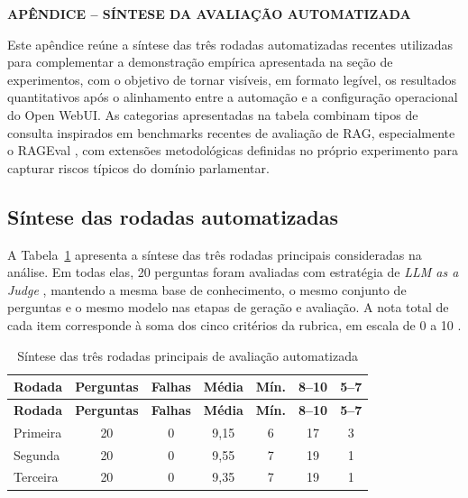 \appendix
\clearpage
{}
{}
\begin{center}
\textbf{APÊNDICE  -- SÍNTESE DA AVALIAÇÃO AUTOMATIZADA}
\end{center}
\label{sec:apendice-avaliacao}

Este apêndice reúne a síntese das três rodadas automatizadas recentes utilizadas para complementar a demonstração empírica apresentada na seção de experimentos, com o objetivo de tornar visíveis, em formato legível, os resultados quantitativos após o alinhamento entre a automação e a configuração operacional do Open WebUI. As categorias apresentadas na tabela combinam tipos de consulta inspirados em benchmarks recentes de avaliação de RAG, especialmente o RAGEval \parencite{zhuEtAl2025rageval}, com extensões metodológicas definidas no próprio experimento para capturar riscos típicos do domínio parlamentar.

\subsection{Síntese das rodadas automatizadas}

A Tabela~\ref{tab:rodadas-avaliacao} apresenta a síntese das três rodadas principais consideradas na análise. Em todas elas, 20 perguntas foram avaliadas com estratégia de \textit{LLM as a Judge} \parencite{liuEtAl2025judgeRag}, mantendo a mesma base de conhecimento, o mesmo conjunto de perguntas e o mesmo modelo nas etapas de geração e avaliação. A nota total de cada item corresponde à soma dos cinco critérios da rubrica, em escala de 0 a 10 \parencite{liuEtAl2023geval}.

\begingroup
\footnotesize
\begin{longtable}{@{}>{\raggedright\arraybackslash}p{}cccccc@{}}
\caption{Síntese das três rodadas principais de avaliação automatizada}
\label{tab:rodadas-avaliacao}\\
\textbf{Rodada} & \textbf{Perguntas} & \textbf{Falhas} & \textbf{Média} & \textbf{Mín.} & \textbf{8--10} & \textbf{5--7} \\
\hline
\endfirsthead
\textbf{Rodada} & \textbf{Perguntas} & \textbf{Falhas} & \textbf{Média} & \textbf{Mín.} & \textbf{8--10} & \textbf{5--7} \\
\hline
\endhead
Primeira & 20 & 0 & 9,15 & 6 & 17 & 3 \\
Segunda & 20 & 0 & 9,55 & 7 & 19 & 1 \\
Terceira & 20 & 0 & 9,35 & 7 & 19 & 1 \\
\hline
\end{longtable}
\endgroup

